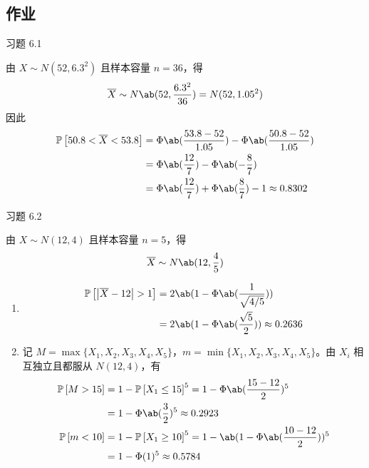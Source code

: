 \subsection{作业}

\begin{problem}
    习题 6.1
    \begin{solution}
        由 $X \sim N(52, 6.3^2)$ 且样本容量 $n = 36$，得
        $$
        \overline{X} \sim N\ab(52, \frac{6.3^2}{36}) = N(52, 1.05^2)
        $$
        因此
        $$
        \begin{aligned}
            \prob{50.8 < \overline{X} < 53.8} & = \Phi\ab(\frac{53.8 - 52}{1.05}) - \Phi\ab(\frac{50.8 - 52}{1.05}) \\
            & = \Phi\ab(\frac{12}{7}) - \Phi\ab(-\frac{8}{7}) \\
            & = \Phi\ab(\frac{12}{7}) + \Phi\ab(\frac{8}{7}) - 1 \approx 0.8302
        \end{aligned}
        $$
    \end{solution}
\end{problem}

\begin{problem}
    习题 6.2
    \begin{solution}
        由 $X \sim N(12, 4)$ 且样本容量 $n = 5$，得
        $$
        \overline{X} \sim N\ab(12, \frac{4}{5})
        $$
        \begin{enumerate}
            \item[\textbf{1)}]
            $$
            \begin{aligned}
                \prob{\abs{\overline{X} - 12} > 1} & = 2 \ab(1 - \Phi\ab(\frac{1}{\sqrt{4 / 5}})) \\
                & = 2 \ab(1 - \Phi\ab(\frac{\sqrt{5}}{2})) \approx 0.2636
            \end{aligned}
            $$
            \item[\textbf{2)}] 记 $M = \max\{X_1, X_2, X_3, X_4, X_5\}$，$m = \min\{X_1, X_2, X_3, X_4, X_5\}$。由 $X_i$ 相互独立且都服从 $N(12, 4)$，有
            $$
            \begin{aligned}
                \prob{M > 15} & = 1 - \prob{X_1 \le 15}^5 = 1 - \Phi\ab(\frac{15 - 12}{2})^5 \\
                & = 1 - \Phi\ab(\frac{3}{2})^5 \approx 0.2923 \\
                \prob{m < 10} & = 1 - \prob{X_1 \ge 10}^5 = 1 - \ab(1 - \Phi\ab(\frac{10 - 12}{2}))^5 \\
                & = 1 - \Phi(1)^5 \approx 0.5784
            \end{aligned}
            $$
        \end{enumerate}
    \end{solution}
\end{problem}

